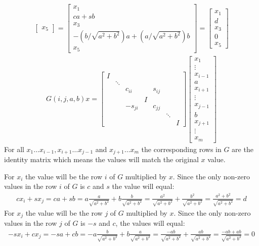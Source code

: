 \documentclass[10pt,a4paper]{article}
\theoremstyle{plain}
\theoremstyle{definition}
\begin{document}
\begin{enumerate}
\begin{align*}
\begin{bmatrix}
        x_5
      \end{bmatrix}
      =
      \begin{bmatrix}
        x_1 \\
        ca+sb \\
        x_3 \\
        -(b/\sqrt{a^2+b^2})a+(a/\sqrt{a^2+b^2})b \\
        x_5
      \end{bmatrix}
      =
      \begin{bmatrix}
        x_1 \\
        d \\
        x_3 \\
        0 \\
        x_5
      \end{bmatrix}
  \end{align*}
  \begin{align*}
    G(i,j,a,b)x=
    \begin{bmatrix}
      I\\
      & \ddots \\
      && c_{ii} & & s_{ij} \\
      &&    &I&   \\
      && -s_{ji} && c_{jj} \\
      &&&&& \ddots \\
      &&&&&& I
    \end{bmatrix}
    \begin{bmatrix}
      x_1 \\ \vdots \\ x_{i-1} \\ a \\ x_{i+1} \\ \vdots \\ x_{j-1} \\ b \\ x_{j+1} \\ \vdots \\ x_m
    \end{bmatrix}
  \end{align*}
  For all $x_1 \ldots x_{i-1}, x_{i+1} \ldots x_{j-1}$ and $x_{j+1} \ldots x_m$ the corresponding rows in $G$ are the identity matrix which means the values will match the original $x$ value.
  
  For $x_i$ the value will be the row $i$ of $G$ multiplied by $x$. Since the only non-zero values in the row $i$ of $G$ is $c$ and $s$ the value will equal:
  \begin{align*}
  	cx_i+sx_j=ca+sb=a \frac{a}{\sqrt{a^2+b^2}}+b\frac{b}{\sqrt{a^2+b^2}}=\frac{a^2}{\sqrt{a^2+b^2}}+\frac{b^2}{\sqrt{a^2+b^2}}=\frac{a^2+b^2}{\sqrt{a^2+b^2}}=d
  \end{align*}
  For $x_j$ the value will be the row $j$ of $G$ multiplied by $x$. Since the only non-zero values in the row $j$ of $G$ is $-s$ and $c$, the values will equal:
  \begin{align*}
  	-sx_i+cx_j=-sa+cb=-a\frac{b}{\sqrt{a^2+b^2}}+b\frac{a}{\sqrt{a^2+b^2}}=\frac{-ab}{\sqrt{a^2+b^2}}+\frac{ab}{\sqrt{a^2+b^2}}=\frac{-ab+ab}{\sqrt{a^2+b^2}}=0
  \end{align*}


\end{enumerate}
\end{document}
